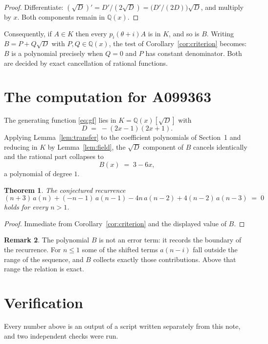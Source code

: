 \documentclass[11pt,a4paper]{article}
\theoremstyle{plain}
\newtheorem{theorem}{Theorem}
\theoremstyle{definition}
\newtheorem{remark}[theorem]{Remark}
\begin{document}
\begin{proof}
Differentiate: $(\sqrt{D})'=D'/(2\sqrt{D})=\bigl(D'/(2D)\bigr)\sqrt{D}$, and multiply by
$x$. Both components remain in $\mathbb{Q}(x)$.
\end{proof}

Consequently, if $A\in K$ then every $p_{i}(\theta+i)A$ is in $K$, and so is $B$. Writing
$B=P+Q\sqrt{D}$ with $P,Q\in\mathbb{Q}(x)$, the test of Corollary~\ref{cor:criterion}
becomes: $B$ is a polynomial precisely when $Q=0$ and $P$ has constant denominator. Both
are decided by exact cancellation of rational functions.

\section{The computation for A099363}

The generating function \eqref{eq:gf} lies in $K=\mathbb{Q}(x)[\sqrt{D}]$ with
\[
D \;=\; - \left(2 x - 1\right) \left(2 x + 1\right) .
\]
Applying Lemma~\ref{lem:transfer} to the coefficient polynomials of Section~1 and reducing
in $K$ by Lemma~\ref{lem:field}, the $\sqrt{D}$ component of $B$ cancels identically and
the rational part collapses to
\[
B(x)\;=\;3 - 6 x ,
\]
a polynomial of degree $1$.

\begin{theorem}
The conjectured recurrence
\[
(n + 3)\,a(n) + (- n - 1)\,a(n-1) -  4 n\,a(n-2) + 4 \left(n - 2\right)\,a(n-3) \;=\;0
\]
holds for every $n>1$.
\end{theorem}

\begin{proof}
Immediate from Corollary~\ref{cor:criterion} and the displayed value of $B$.
\end{proof}

\begin{remark}
The polynomial $B$ is not an error term: it records the boundary of the recurrence. For
$n\le1$ some of the shifted terms $a(n-i)$ fall outside the range of the sequence,
and $B$ collects exactly those contributions. Above that range the relation is exact.
\end{remark}

\section{Verification}

Every number above is an output of a script written separately from this note, and two
independent checks were run.
\end{document}
